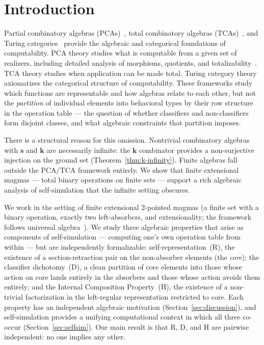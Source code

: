 \documentclass[sigconf,screen]{acmart}
\theoremstyle{remark}
\begin{document}
\maketitle

\section{Introduction}
\label{sec:introduction}

Partial combinatory algebras (PCAs)~\cite{vanoosten08,longley15}, total combinatory algebras (TCAs)~\cite{bethke88}, and Turing categories~\cite{cockett08} provide the algebraic and categorical foundations of computability. PCA theory studies what is computable from a given set of realizers, including detailed analysis of morphisms, quotients, and totalizability~\cite{bethke96}. TCA theory studies when application can be made total. Turing category theory axiomatizes the categorical structure of computability. These frameworks study which functions are representable and how algebras relate to each other, but not the \emph{partition} of individual elements into behavioral types by their row structure in the operation table --- the question of whether classifiers and non-classifiers form disjoint classes, and what algebraic constraints that partition imposes.

There is a structural reason for this omission. Nontrivial combinatory algebras with $\mathbf{s}$ and $\mathbf{k}$ are necessarily infinite: the $\mathbf{k}$ combinator provides a non-surjective injection on the ground set (Theorem~\ref{thm:k-infinity}). Finite algebras fall outside the PCA/TCA framework entirely. We show that finite extensional magmas --- total binary operations on finite sets --- support a rich algebraic analysis of self-simulation that the infinite setting obscures.

We work in the setting of finite extensional 2-pointed magmas (a finite set with a binary operation, exactly two left-absorbers, and extensionality; the framework follows universal algebra~\cite{burris81}). We study three algebraic properties that arise as components of self-simulation --- computing one's own operation table from within --- but are independently formalizable: self-representation~(R), the existence of a section-retraction pair on the non-absorber elements (the \emph{core}); the classifier dichotomy~(D), a clean partition of core elements into those whose action on core lands entirely in the absorbers and those whose action avoids them entirely; and the Internal Composition Property~(H), the existence of a non-trivial factorization in the left-regular representation restricted to core. Each property has an independent algebraic motivation (Section~\ref{sec:discussion}), and self-simulation provides a unifying computational context in which all three co-occur (Section~\ref{sec:selfsim}). Our main result is that R, D, and H are pairwise independent: no one implies any other.
\end{document}
